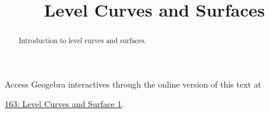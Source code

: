 \documentclass{ximera}
\title{Level Curves and Surfaces}
\begin{document}
\begin{abstract}
Introduction to level curves and surfaces.
\end{abstract}
\maketitle



\begin{example}  \label{Edfhpgdf45}

 
\begin{onlineOnly}
    \begin{center}
\end{center}
\end{onlineOnly}

Access Geogebra interactives through the online version of this text at
 
\href{https://www.geogebra.org/classic/nk4ap6kj}{163: Level Curves and Surface 1}.


\end{example}
\end{document}
